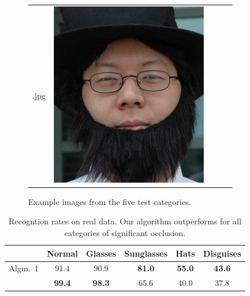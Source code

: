 \begin{figure}
\begin{tabular}{ccccc}
.jpg} & \includegraphics[width=\imagewidth]{figures_iccv/real_data_examples/disguise_5.jpg}
\end{tabular}
\caption{Example images from the five test categories.} \label{fig:real-data-ex}
\end{figure}

\begin{table}[t]
\centering
\begin{tabular}{|c|c|c|c|c|c|}
\hline
& Normal & Glasses & Sunglasses & Hats & Disguises \\
\hline
Algm.\ 1 & 91.4 & 90.9 & {\bf 81.0} & {\bf 55.0} & {\bf 43.6} \\
\hline
\cite{Wright2009-PAMI} & {\bf 99.4} & {\bf 98.3} & 65.6 & 40.0 & 37.8 \\
\hline
\end{tabular}
\caption{Recogntion rates on real data. Our algorithm outperforms \cite{Wright2009-PAMI} for all categories of significant occlusion.} \label{tab:real-data-rates}
\end{table}

